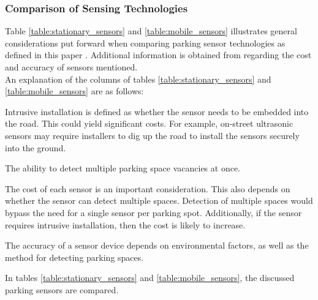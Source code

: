 \subsubsection*{Comparison of Sensing Technologies}
Table \ref{table:stationary_sensors} and \ref{table:mobile_sensors} illustrates general considerations put forward when comparing parking sensor technologies as defined in this paper \citep{Lin2008SecurityNetworks}. Additional information is obtained from \citep{dokur_embedded_2016} regarding the cost and accuracy of sensors mentioned. \\

\noindent An explanation of the columns of tables \ref{table:stationary_sensors} and \ref{table:mobile_sensors} are as follows:
\begin{description}[leftmargin=14em, style=nextline]
    \item[Intrusive Installation (IV)] Intrusive installation is defined as whether the sensor needs to be embedded into the road. This could yield significant costs. For example, on-street ultrasonic sensors may require installers to dig up the road to install the sensors securely into the ground.
    \item[Multiple Detection (MD)] The ability to detect multiple parking space vacancies at once.
    \item[Cost (C)] The cost of each sensor is an important consideration. This also depends on whether the sensor can detect multiple spaces. Detection of multiple spaces would bypass the need for a single sensor per parking spot. Additionally, if the sensor requires intrusive installation, then the cost is likely to increase.
    \item[Accuracy (A)] The accuracy of a sensor device depends on environmental factors, as well as the method for detecting parking spaces.
\end{description}

In tables \ref{table:stationary_sensors} and \ref{table:mobile_sensors}, the discussed parking sensors are compared.

